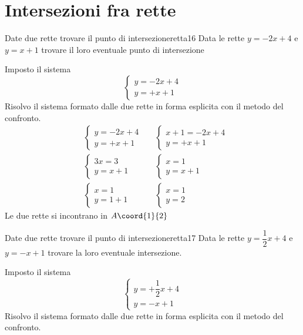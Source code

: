 \section{Intersezioni fra rette}
\begin{esempiot}{Date due rette trovare il punto di intersezione}{retta16}
	Data le rette $y=-2x+4$ e $y=x+1$ trovare il loro eventuale punto di intersezione
\end{esempiot}
Imposto il sistema 
\[\begin{cases} 
	y=-2x+4\\
	y=+x+1
\end{cases}\]
Risolvo il sistema formato dalle due rette in forma esplicita con il metodo del confronto.
\begin{align*}
	&\begin{cases} 
		y=-2x+4\\
		y=+x+1
	\end{cases}&&\begin{cases} 
	x+1=-2x+4\\
	y=+x+1
\end{cases}\\
&\begin{cases} 
	3x=3\\
	y=x+1
\end{cases}&&\begin{cases} 
x=1\\
y=x+1
\end{cases}\\
&\begin{cases} 
	x=1\\
	y=1+1
\end{cases}&&
\begin{cases} 
	x=1\\
	y=2
\end{cases}
\end{align*}
Le due rette si incontrano in $A\coord{1}{2}$
\begin{esempiot}{Date due rette trovare il punto di intersezione}{retta17}
	Data le rette $y=\dfrac{1}{2}x+4$ e $y=-x+1$ trovare la loro eventuale intersezione.
\end{esempiot}
Imposto il sistema 
\[\begin{cases} 
y=+\dfrac{1}{2}x+4\\
y=-x+1
\end{cases}\]
Risolvo il sistema formato dalle due rette in forma esplicita con il metodo del confronto.

